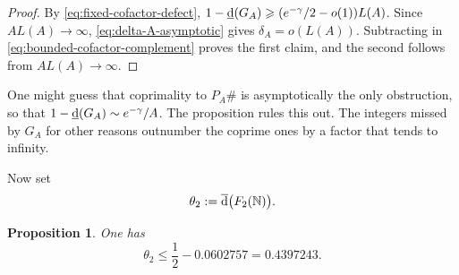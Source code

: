 \documentclass[11pt,letterpaper,reqno]{amsart}
\numberwithin{equation}{section}
\newtheorem{proposition}[theorem]{Proposition}
\theoremstyle{remark}
\newcommand{\N}{\mathbb{N}}
\newcommand{\lowerdens}{\underline{\textup{d}}}
\newcommand{\upperdens}{\overline{\textup{d}}}
\renewcommand{\leq}{\leqslant}
\renewcommand{\geq}{\geqslant}
\begin{document}
\begin{proof}
By \eqref{eq:fixed-cofactor-defect},
$1-\lowerdens(G_A)\geq(e^{-\gamma}/2-o(1))L(A)$. Since $AL(A)\to\infty$,
\eqref{eq:delta-A-asymptotic} gives $\delta_A=o(L(A))$. Subtracting in
\eqref{eq:bounded-cofactor-complement} proves the first claim, and the
second follows from $AL(A)\to\infty$.
\end{proof}

One might guess that coprimality to $P_A\#$ is asymptotically
the only obstruction, so that $1-\lowerdens(G_A)\sim e^{-\gamma}/A$. The
proposition rules this out. The integers missed by $G_A$ for other reasons
outnumber the coprime ones by a factor that tends to infinity.

Now set
\[
 \theta_2:=\upperdens\bigl(F_2(\N)\bigr).
\]

\begin{proposition}\label{prop:theta-two}
One has
\[
 \theta_2\leq\frac12-0.0602757=0.4397243.
\]
\end{proposition}
\end{document}
